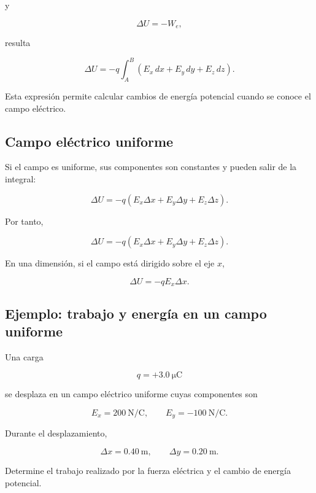 y

\[
\Delta U=-W_e,
\]

resulta

\begin{equation}
\boxed{
\Delta U
=
-q\int_A^B
\left(
E_x\,dx+E_y\,dy+E_z\,dz
\right)
}.
\label{eq:deltaU_campo_componentes}
\end{equation}

Esta expresión permite calcular cambios de energía potencial cuando se conoce el campo
eléctrico.


\subsection{Campo eléctrico uniforme}

Si el campo es uniforme, sus componentes son constantes y pueden salir de la integral:

\[
\Delta U
=
-q
\left(
E_x\Delta x+
E_y\Delta y+
E_z\Delta z
\right).
\]

Por tanto,

\begin{equation}
\boxed{
\Delta U
=
-q
\left(
E_x\Delta x+
E_y\Delta y+
E_z\Delta z
\right)
}.
\label{eq:deltaU_campo_uniforme}
\end{equation}

En una dimensión, si el campo está dirigido sobre el eje \(x\),

\begin{equation}
\boxed{
\Delta U=-qE_x\Delta x
}.
\label{eq:deltaU_uniforme_1d}
\end{equation}


\subsection{Ejemplo: trabajo y energía en un campo uniforme}

\begin{ejemplo}

Una carga

\[
q=+\SI{3.0}{\micro\coulomb}
\]

se desplaza en un campo eléctrico uniforme cuyas componentes son

\[
E_x=\SI{200}{\newton\per\coulomb},
\qquad
E_y=-\SI{100}{\newton\per\coulomb}.
\]

Durante el desplazamiento,

\[
\Delta x=\SI{0.40}{\metre},
\qquad
\Delta y=\SI{0.20}{\metre}.
\]

Determine el trabajo realizado por la fuerza eléctrica y el cambio de energía
potencial.

\end{ejemplo}

